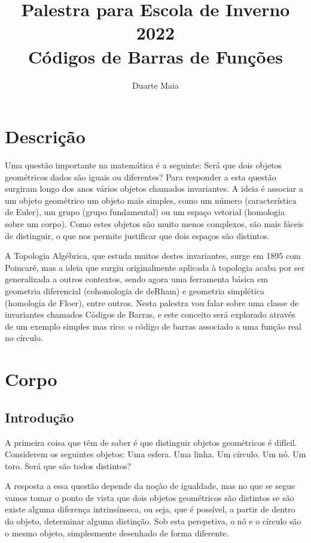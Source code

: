\documentclass{article}
\title{Palestra para Escola de Inverno 2022\\
Códigos de Barras de Funções}
\author{Duarte Maia}
\theoremstyle{nonumberplain}
\begin{document}
\maketitle

\section{Descrição}

Uma questão importante na matemática é a seguinte: Será que dois objetos geométricos dados são iguais ou diferentes? Para responder a esta questão surgiram longo dos anos vários objetos chamados invariantes. A ideia é associar a um objeto geométrico um objeto mais simples, como um número (característica de Euler), um grupo (grupo fundamental) ou um espaço vetorial (homologia sobre um corpo). Como estes objetos são muito menos complexos, são mais fáceis de distinguir, o que nos permite justificar que dois espaços são distintos.

A Topologia Algébrica, que estuda muitos destes invariantes, surge em 1895 com Poincaré, mas a ideia que surgiu originalmente aplicada à topologia acaba por ser generalizada a outros contextos, sendo agora uma ferramenta básica em geometria diferencial (cohomologia de deRham) e geometria simplética (homologia de Floer), entre outros. Nesta palestra vou falar sobre uma classe de invariantes chamados Códigos de Barras, e este conceito será explorado através de um exemplo simples mas rico: o código de barras associado a uma função real no círculo.

\section{Corpo}

\subsection{Introdução}

A primeira coisa que têm de saber é que distinguir objetos geométricos é difícil. Considerem os seguintes objetos: Uma esfera. Uma linha. Um círculo. Um nó. Um toro. Será que são todos distintos?

A resposta a essa questão depende da noção de igualdade, mas no que se segue vamos tomar o ponto de vista que dois objetos geométricos são distintos se são existe alguma diferença intrinsínseca, ou seja, que é possível, a partir de dentro do objeto, determinar alguma distinção. Sob esta perspetiva, o nó e o círculo são o mesmo objeto, simplesmente desenhado de forma diferente.
\end{document}
